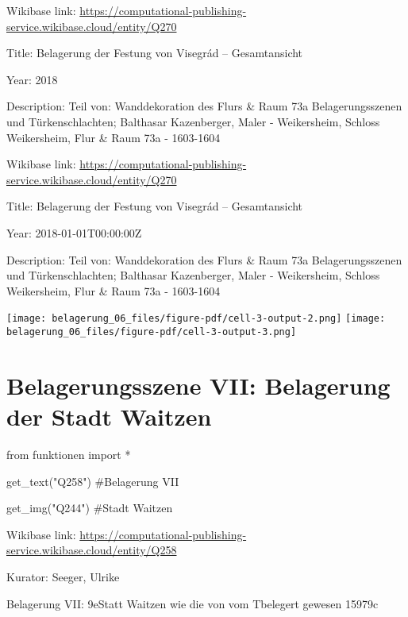 \documentclass[
  a4paper,
  portrait]{book}
\newenvironment{Shaded}{\begin{snugshade}}{\end{snugshade}}
\newcommand{\CommentTok}[1]{\textcolor[rgb]{0.37,0.37,0.37}{#1}}
\newcommand{\ImportTok}[1]{\textcolor[rgb]{0.00,0.46,0.62}{#1}}
\newcommand{\NormalTok}[1]{\textcolor[rgb]{0.00,0.23,0.31}{#1}}
\newcommand{\OperatorTok}[1]{\textcolor[rgb]{0.37,0.37,0.37}{#1}}
\newcommand{\StringTok}[1]{\textcolor[rgb]{0.13,0.47,0.30}{#1}}
\begin{document}
Wikibase link:
\url{https://computational-publishing-service.wikibase.cloud/entity/Q270}

Title: Belagerung der Festung von Visegrád -- Gesamtansicht

Year: 2018

Description: Teil von: Wanddekoration des Flurs \& Raum 73a
Belagerungsszenen und Türkenschlachten; Balthasar Kazenberger, Maler -
Weikersheim, Schloss Weikersheim, Flur \& Raum 73a - 1603-1604

Wikibase link:
\url{https://computational-publishing-service.wikibase.cloud/entity/Q270}

Title: Belagerung der Festung von Visegrád -- Gesamtansicht

Year: 2018-01-01T00:00:00Z

Description: Teil von: Wanddekoration des Flurs \& Raum 73a
Belagerungsszenen und Türkenschlachten; Balthasar Kazenberger, Maler -
Weikersheim, Schloss Weikersheim, Flur \& Raum 73a - 1603-1604

\texttt{[image: belagerung\_06\_files/figure-pdf/cell-3-output-2.png]}
\texttt{[image: belagerung\_06\_files/figure-pdf/cell-3-output-3.png]}

\chapter{Belagerungsszene VII: Belagerung der Stadt
Waitzen}\label{belagerungsszene-vii-belagerung-der-stadt-waitzen}

\begin{Shaded}
\begin{Highlighting}[]
\ImportTok{from}\NormalTok{ funktionen }\ImportTok{import} \OperatorTok{*}
\end{Highlighting}
\end{Shaded}

\begin{Shaded}
\begin{Highlighting}[]
\NormalTok{get\_text(}\StringTok{"Q258"}\NormalTok{)}
\CommentTok{\#Belagerung VII}

\NormalTok{get\_img(}\StringTok{"Q244"}\NormalTok{)}
\CommentTok{\#Stadt Waitzen}
\end{Highlighting}
\end{Shaded}

Wikibase link:
\url{https://computational-publishing-service.wikibase.cloud/entity/Q258}

Kurator: Seeger, Ulrike

Belagerung VII: \x9eStatt Waitzen wie die von vom
T\xbcrcken belegert gewesen 1597\x9c
\end{document}

